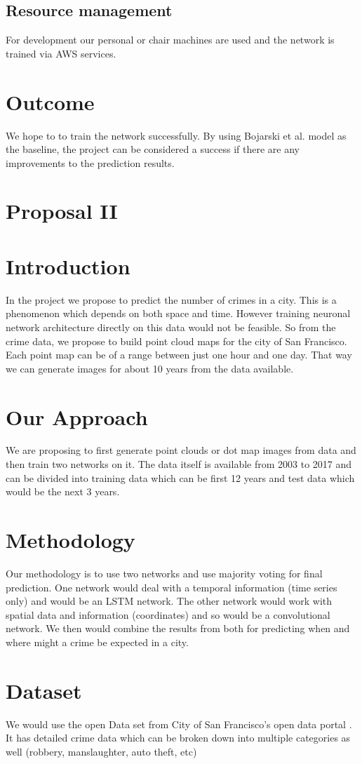 \documentclass[10pt,twocolumn,letterpaper]{article}
\begin{document}
\subsection{Resource management}
For development our personal or chair machines are used and the network is trained via AWS services.

\section{Outcome}
We hope to to train the network successfully. By using Bojarski et al.\cite{DBLP:journals/corr/BojarskiTDFFGJM16} model as the baseline, the project can be considered a success if there are any improvements to the prediction results.

%
%
\section*{Proposal II}
\setcounter{section}{0}
\section{Introduction}
In the project we propose to predict the number of crimes in a city. This is a phenomenon which depends on both space and time. However training neuronal network architecture directly on this data would not be feasible. So from the crime data, we propose to build point cloud maps for the city of San Francisco. Each point map can be of a range between just one hour and one day. That way we can generate images for about 10 years from the data available. 

\section{Our Approach}
We are proposing to first generate point clouds or dot map images from data and then train two networks on it. The data itself is available from 2003 to 2017 and can be divided into training data which can be first 12 years and test data which would be the next 3 years. 

\section{Methodology}
Our methodology is to use two networks and use majority voting for final prediction. One network would deal with a temporal information (time series only) and would be an LSTM network. The other network would work with spatial data and information (coordinates) and so would be a convolutional network. We then would combine the results from both for predicting when and where might a crime be expected in a city.

\section{Dataset}          
We would use the open Data set from City of San Francisco's open data portal \cite{SFopendata}. It has detailed crime data which can be broken down into multiple categories as well (robbery, manslaughter, auto theft, etc)

{\small


}
\end{document}
